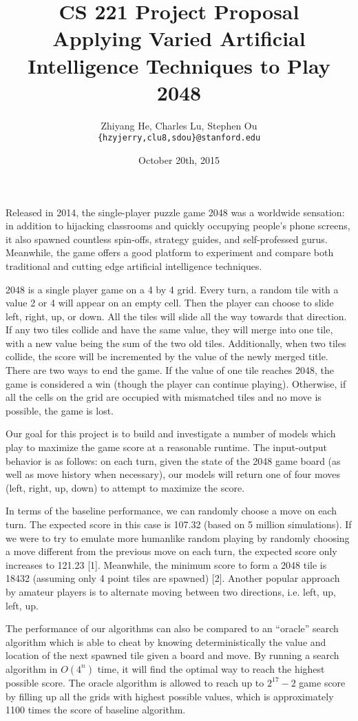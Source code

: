 \documentclass[11pt]{article}
\title{CS 221 Project Proposal \\ Applying Varied Artificial Intelligence Techniques to Play 2048}
\author{Zhiyang He, Charles Lu, Stephen Ou \\ \texttt{\{hzyjerry,clu8,sdou\}@stanford.edu}}
\date{October 20th, 2015}
\begin{document}
\maketitle

Released in 2014, the single-player puzzle game 2048 was a worldwide sensation: in addition to hijacking classrooms and quickly occupying people’s phone screens, it also spawned countless spin-offs, strategy guides, and self-professed gurus. Meanwhile, the game offers a good platform to experiment and compare both traditional and cutting edge artificial intelligence techniques.

2048 is a single player game on a 4 by 4 grid. Every turn, a random tile with a value 2 or 4 will appear on an empty cell. Then the player can choose to slide left, right, up, or down. All the tiles will slide all the way towards that direction. If any two tiles collide and have the same value, they will merge into one tile, with a new value being the sum of the two old tiles. Additionally, when two tiles collide, the score will be incremented by the value of the newly merged title. There are two ways to end the game. If the value of one tile reaches 2048, the game is considered a win (though the player can continue playing). Otherwise, if all the cells on the grid are occupied with mismatched tiles and no move is possible, the game is lost.

Our goal for this project is to build and investigate a number of models which play to maximize the game score at a reasonable runtime. The input-output behavior is as follows: on each turn, given the state of the 2048 game board (as well as move history when necessary), our models will return one of four moves (left, right, up, down) to attempt to maximize the score.

In terms of the baseline performance, we can randomly choose a move on each turn. The expected score in this case is 107.32 (based on 5 million simulations). If we were to try to emulate more humanlike random playing by randomly choosing a move different from the previous move on each turn, the expected score only increases to 121.23 [1]. Meanwhile, the minimum score to form a 2048 tile is 18432 (assuming only 4 point tiles are spawned) [2]. Another popular approach by amateur players is to alternate moving between two directions, i.e. left, up, left, up.

The performance of our algorithms can also be compared to an “oracle” search algorithm which is able to cheat by knowing deterministically the value and location of the next spawned tile given a board and move. By running a search algorithm in $O(4^n)$ time, it will find the optimal way to reach the highest possible score. The oracle algorithm is allowed to reach up to $2^{17} - 2$ game score by filling up all the grids with highest possible values, which is approximately 1100 times the score of baseline algorithm.
\end{document}
